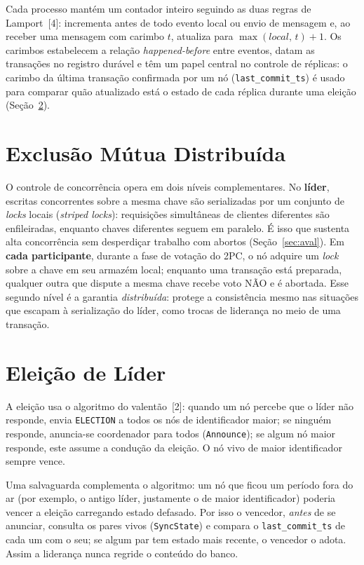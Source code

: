 \documentclass[10pt,twocolumn]{article}
\begin{document}
Cada processo mantém um contador inteiro seguindo as duas regras de
Lamport~[4]: incrementa antes de todo evento local ou envio de mensagem e,
ao receber uma mensagem com carimbo $t$, atualiza para
$\max(\mathit{local},\,t)+1$. Os carimbos estabelecem a relação
\emph{happened-before} entre eventos, datam as transações no registro
durável e têm um papel central no controle de réplicas: o carimbo da última
transação confirmada por um nó (\texttt{last\_commit\_ts}) é usado para
comparar quão atualizado está o estado de cada réplica durante uma eleição
(Seção~\ref{sec:eleicao}).

\section{Exclusão Mútua Distribuída}
\label{sec:mutex}

O controle de concorrência opera em dois níveis complementares. No
\textbf{líder}, escritas concorrentes sobre a mesma chave são serializadas
por um conjunto de \emph{locks} locais (\emph{striped locks}): requisições
simultâneas de clientes diferentes são enfileiradas, enquanto chaves
diferentes seguem em paralelo. É isso que sustenta alta concorrência sem
desperdiçar trabalho com abortos (Seção~\ref{sec:aval}). Em \textbf{cada
participante}, durante a fase de votação do 2PC, o nó adquire um
\emph{lock} sobre a chave em seu armazém local; enquanto uma transação está
preparada, qualquer outra que dispute a mesma chave recebe voto NÃO e é
abortada. Esse segundo nível é a garantia \emph{distribuída}: protege a
consistência mesmo nas situações que escapam à serialização do líder, como
trocas de liderança no meio de uma transação.

\section{Eleição de Líder}
\label{sec:eleicao}

A eleição usa o algoritmo do valentão~[2]: quando um nó percebe que o líder
não responde, envia \texttt{ELECTION} a todos os nós de identificador
maior; se ninguém responde, anuncia-se coordenador para todos
(\texttt{Announce}); se algum nó maior responde, este assume a condução da
eleição. O nó vivo de maior identificador sempre vence.

Uma salvaguarda complementa o algoritmo: um nó que ficou um período fora do
ar (por exemplo, o antigo líder, justamente o de maior identificador)
poderia vencer a eleição carregando estado defasado. Por isso o vencedor,
\emph{antes} de se anunciar, consulta os pares vivos (\texttt{SyncState}) e
compara o \texttt{last\_commit\_ts} de cada um com o seu; se algum par tem
estado mais recente, o vencedor o adota. Assim a liderança nunca regride o
conteúdo do banco.
\end{document}

